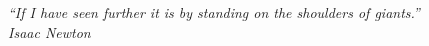 \begin{epigrafe}
    \vspace*{\fill}
    \begin{flushright}
        \textit{``If I have seen further it is by standing on the shoulders of giants.''\\
       Isaac Newton}
    \end{flushright}
\end{epigrafe}
